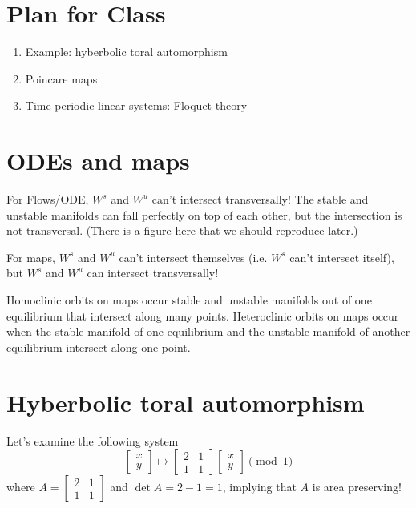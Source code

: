 \documentclass{article}
\begin{document}
\section{Plan for Class}
\begin{enumerate}
    \item Example: hyberbolic toral automorphism
    \item Poincare maps
    \item Time-periodic linear systems: Floquet theory
\end{enumerate}

\section{ODEs and maps}

For Flows/ODE, $W^s$ and $W^u$ can't intersect transversally! The stable and unstable manifolds can fall perfectly on top of each other, but the intersection is not transversal. (There is a figure here that we should reproduce later.)

For maps, $W^s$ and $W^u$ can't intersect themselves (i.e. $W^s$ can't intersect itself), but $W^s$ and $W^u$ can intersect transversally!

Homoclinic orbits on maps occur stable and unstable manifolds out of one equilibrium that intersect along many points. Heteroclinic orbits on maps occur when the stable manifold of one equilibrium and the unstable manifold of another equilibrium intersect along one point.

\section{Hyberbolic toral automorphism}

Let's examine the following system 
\[
\begin{bmatrix}
    x\\y
\end{bmatrix}\longmapsto\begin{bmatrix}
    2 & 1 \\ 1 & 1
\end{bmatrix}\begin{bmatrix}
    x\\y
\end{bmatrix} \pmod 1
\]
where $A=\begin{bmatrix}2 & 1 \\ 1 & 1\end{bmatrix}$ and $\operatorname{det} A=2-1=1$, implying that $A$ is area preserving!
\end{document}
